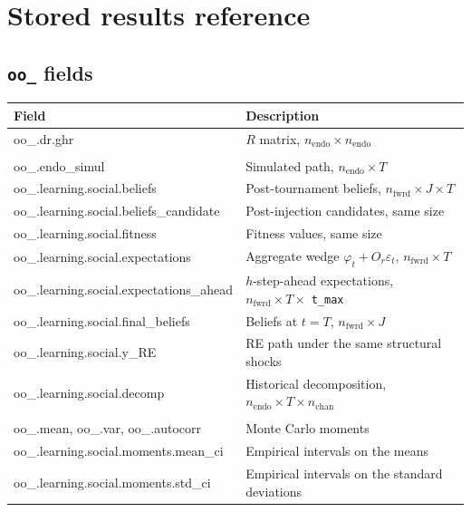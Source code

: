 \documentclass[11pt,a4paper]{article}
\begin{document}
\section{Stored results reference}
\label{sec:output}

\subsection{\texttt{oo\_} fields}

\begin{longtable}{>{\ttfamily\small}p{6.2cm} p{8cm}}
\toprule
\normalfont\textbf{Field} & \textbf{Description} \\
\midrule
\endhead
oo\_.dr.ghr & $R$ matrix, $n_{\text{endo}} \times n_{\text{endo}}$ \\
\midrule
\multicolumn{2}{l}{\normalfont\textit{Simulation}} \\
\midrule
oo\_.endo\_simul & Simulated path, $n_{\text{endo}} \times T$ \\
oo\_.learning.social.beliefs & Post-tournament beliefs, $n_{\text{fwrd}} \times J \times T$ \\
oo\_.learning.social.beliefs\_candidate & Post-injection candidates, same size \\
oo\_.learning.social.fitness & Fitness values, same size \\
oo\_.learning.social.expectations & Aggregate wedge $\varphi_t + O_r\varepsilon_t$, $n_{\text{fwrd}} \times T$ \\
oo\_.learning.social.expectations\_ahead & $h$-step-ahead expectations, $n_{\text{fwrd}} \times T \times$ \texttt{t\_max} \\
oo\_.learning.social.final\_beliefs & Beliefs at $t = T$, $n_{\text{fwrd}} \times J$ \\
oo\_.learning.social.y\_RE & RE path under the same structural shocks \\
oo\_.learning.social.decomp & Historical decomposition, $n_{\text{endo}} \times T \times n_{\text{chan}}$ \\
\midrule
\multicolumn{2}{l}{\normalfont\textit{Moments and IRFs}} \\
\midrule
oo\_.mean, oo\_.var, oo\_.autocorr & Monte Carlo moments \\
oo\_.learning.social.moments.mean\_ci & Empirical intervals on the means \\
oo\_.learning.social.moments.std\_ci & Empirical intervals on the standard deviations \\

\end{longtable}
\end{document}
